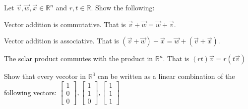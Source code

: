 \begin{exercise}
Let $\vec{v},\vec{w},\vec{x} \in \mathbb{R}^n$ and $r,t \in \mathbb{R}$. Show the following:\\
\begin{inparaenum}[a.)]
\item Vector addition is commutative. That is $\vec{v}+\vec{w}=\vec{w}+\vec{v}$.\\
\item Vector addition is associative. That is $(\vec{v}+\vec{w})+\vec{x}=\vec{w}+(\vec{v}+\vec{x})$.\\
\item The sclar product commutes with the product in $\mathbb{R}^n$. That is $(rt) \vec{v}=r(t \vec{v})$\\
\end{inparaenum} 
\end{exercise}

\begin{exercise}
Show that every vecotor in $\mathbb{R}^3$ can be written as a linear combination of the following vectors: $\begin{bmatrix}1\\ 0 \\ 0\end{bmatrix}, \begin{bmatrix}1\\ 1 \\ 0\end{bmatrix},\begin{bmatrix}1\\ 1 \\ 1\end{bmatrix}$
\end{exercise}


